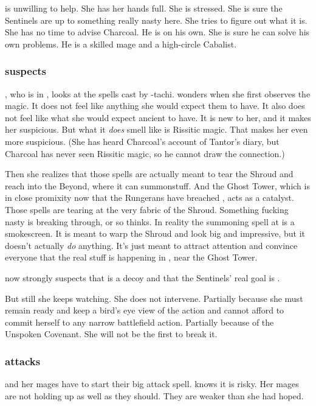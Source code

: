 \Achsah is unwilling to help. 
She has her hands full. 
She is stressed. 
She is sure the Sentinels are up to something really nasty here.
She tries to figure out what it is. 
She has no time to advise Charcoal. 
He is on his own.
She is sure he can solve his own problems. 
He is a skilled mage and a high-circle Cabalist. 





\subsubsection{\Achsah suspects \Takestsha}
\Achsah, who is in \Forclin, looks at the \quo{\EreshKali} spells cast by \Takestsha-tachi. 
\Achsah{} wonders when she first observes the \EreshKali{} magic. 
It does not feel like anything she would expect them to have. 
It also does not feel like what she would expect ancient \meccara{} to have. 
It is new to her, and it makes her suspicious. 
But what it \emph{does} smell like is Rissitic magic. 
That makes her even more suspicious. 
(She has heard Charcoal's account of Tantor's diary, but Charcoal has never seen Rissitic magic, so he cannot draw the connection.) 

Then she realizes that those spells are actually meant to tear the Shroud and reach into the Beyond, where it can summon\prikker stuff. 
And the Ghost Tower, which is in close promixity now that the Rungerans have breached \Forclin, acts as a catalyst. 
Those spells are tearing at the very fabric of the Shroud. 
Something fucking nasty is breaking through, or so \Achsah thinks. 
In reality the summoning spell at \Forclin is a smokescreen. 
It is meant to warp the Shroud and look big and impressive, but it doesn't actually \emph{do} anything. 
It's just meant to attract attention and convince everyone that the real stuff is happening in \Forclin, near the Ghost Tower. 

\Achsah now strongly suspects that \Malcur is a decoy and that the Sentinels' real goal is \Forclin. 

But still she keeps watching.
She does not intervene. 
Partially because she must remain ready and keep a bird's eye view of the action and cannot afford to commit herself to any narrow battlefield action.
Partially because of the Unspoken Covenant.
She will not be the first to break it. 





\subsubsection{\Takestsha attacks}
\Takestsha and her mages have to start their big attack spell. 
\Takestsha knows it is risky. 
Her mages are not holding up as well as they should. 
They are weaker than she had hoped. 

